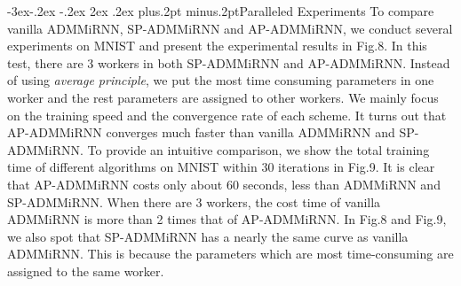 \documentclass[twoside]{article}
\makeatletter
\def\subsection{\@startsection{subsection}{2}{\z@}%
 {-3ex\@plus -.2ex \@minus -.2ex}%
 {2ex \@plus.2ex}%
{\normalfont\normalsize\protect\baselineskip=12.5pt plus.2pt minus.2pt\bfseries}}
\makeatother
\begin{document}
\begin{multicols}{2}
\subsection{Paralleled Experiments}
To compare vanilla ADMMiRNN, SP-ADMMiRNN and AP-ADMMiRNN, we conduct several experiments on MNIST and present the experimental results in Fig.8. In this test, there are 3 workers in both SP-ADMMiRNN and AP-ADMMiRNN. Instead of using \textit{average principle}, we put the most time consuming parameters in one worker and the rest parameters are assigned to other workers.  We mainly focus on the training speed and the convergence rate of each scheme. It turns out that AP-ADMMiRNN converges much faster than vanilla ADMMiRNN and SP-ADMMiRNN.
To provide an intuitive comparison, we show the total training time of different algorithms on MNIST within 30 iterations in Fig.9. It is clear that AP-ADMMiRNN costs only about 60 seconds, less than ADMMiRNN and SP-ADMMiRNN.
When there are 3 workers, the cost time of vanilla ADMMiRNN is more than 2 times that of AP-ADMMiRNN. 
In Fig.8 and Fig.9, we also spot that SP-ADMMiRNN has a nearly the same curve as vanilla ADMMiRNN. This is because the parameters which are most time-consuming are assigned to the same worker. 


\end{multicols}
\end{document}

